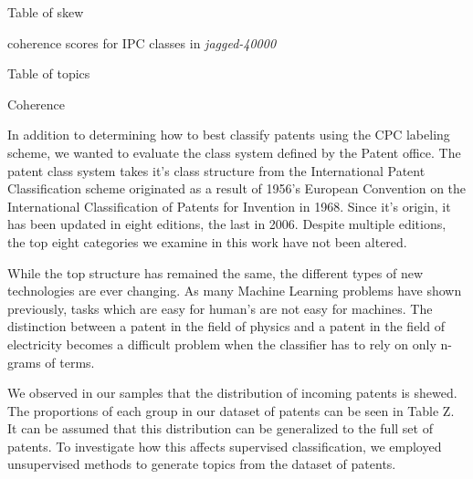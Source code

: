 Table of skew


\begin{tablehere}
	\label{tab:cohere}
	\centering
	\caption{coherence scores for IPC classes in \emph{jagged-40000}}
\end{tablehere}

Table of topics


Coherence

In addition to determining how to best classify patents using the CPC labeling scheme, we wanted to evaluate the class system defined by the Patent office.  The patent class system takes it's class structure from the International Patent Classification scheme originated as a result of 1956's European Convention on the International Classification of Patents for Invention in 1968.  Since it's origin, it has been updated in eight editions, the last in 2006.  Despite multiple editions, the top eight categories we examine in this work have not been altered.
  
While the top structure has remained the same, the different types of new technologies are ever changing.  
As many Machine Learning problems have shown previously, tasks which are easy for human's are not easy for machines.  The distinction between a patent in the field of physics and a patent in the field of electricity becomes a difficult problem when the classifier has to rely on only n-grams of terms. 

We observed in our samples that the distribution of incoming patents is shewed.  The proportions of each group in our dataset of patents can be seen in Table Z.  It can be assumed that this distribution can be generalized to the full set of patents.  To investigate how this affects supervised classification, we employed unsupervised methods to generate topics from the dataset of patents.  

 
